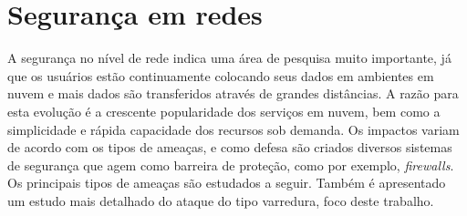 \section{Segurança em redes}
\label{sec:seguranca}

A segurança no nível de rede indica uma área de pesquisa muito importante, já que os usuários estão continuamente colocando seus dados em ambientes em nuvem e mais dados são transferidos através de grandes distâncias. A razão para esta evolução é a crescente popularidade dos serviços em nuvem, bem como a simplicidade e rápida capacidade dos recursos sob demanda. Os impactos variam de acordo com os tipos de ameaças, e como defesa são criados diversos sistemas de segurança que agem como barreira de proteção, como por exemplo, \textit{firewalls}. Os principais tipos de ameaças são estudados a seguir. Também é apresentado um estudo mais detalhado do ataque do tipo varredura, foco deste trabalho.

